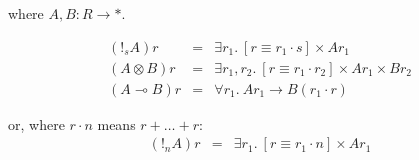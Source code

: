\documentclass{article}
\begin{document}
where $A, B : R \to *$.

\begin{displaymath}
  \begin{array}{lcl}
    (!_sA)r          & = & \exists r_1.~[r \equiv r_1 \cdot s] \times Ar_1 \\
    (A \otimes B)r   & = & \exists r_1, r_2.~[r \equiv r_1 \cdot r_2] \times Ar_1 \times Br_2 \\
    (A \multimap B)r & = & \forall r_1.~Ar_1 \to B(r_1 \cdot r)
  \end{array}
\end{displaymath}

or, where $r \cdot n$ means $r + \dots + r$:
\begin{displaymath}
  \begin{array}{lcl}
    (!_nA)r & = & \exists r_1.~[r \equiv r_1 \cdot n] \times Ar_1
  \end{array}
\end{displaymath}
\end{document}

